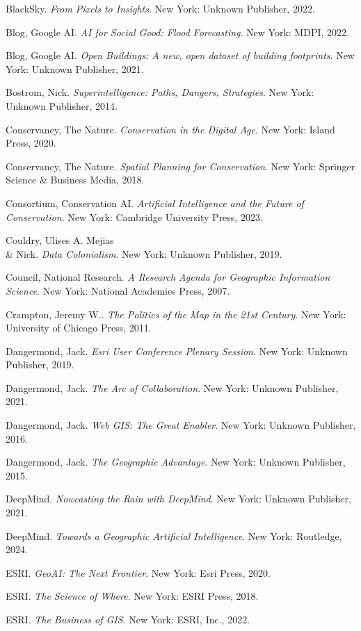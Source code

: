 \begin{hangparas}{0.15in}{1}
BlackSky. \t\textit{From Pixels to Insights}. New York: Unknown Publisher, 2022.

Blog, Google AI. \t\textit{AI for Social Good: Flood Forecasting}. New York: MDPI, 2022.

Blog, Google AI. \t\textit{Open Buildings: A new, open dataset of building footprints}. New York: Unknown Publisher, 2021.

Bostrom, Nick. \t\textit{Superintelligence: Paths, Dangers, Strategies}. New York: Unknown Publisher, 2014.

Conservancy, The Nature. \t\textit{Conservation in the Digital Age}. New York: Island Press, 2020.

Conservancy, The Nature. \t\textit{Spatial Planning for Conservation}. New York: Springer Science & Business Media, 2018.

Consortium, Conservation AI. \t\textit{Artificial Intelligence and the Future of Conservation}. New York: Cambridge University Press, 2023.

Couldry, Ulises A. Mejias \\& Nick. \t\textit{Data Colonialism}. New York: Unknown Publisher, 2019.

Council, National Research. \t\textit{A Research Agenda for Geographic Information Science}. New York: National Academies Press, 2007.

Crampton, Jeremy W.. \t\textit{The Politics of the Map in the 21st Century}. New York: University of Chicago Press, 2011.

Dangermond, Jack. \t\textit{Esri User Conference Plenary Session}. New York: Unknown Publisher, 2019.

Dangermond, Jack. \t\textit{The Arc of Collaboration}. New York: Unknown Publisher, 2021.

Dangermond, Jack. \t\textit{Web GIS: The Great Enabler}. New York: Unknown Publisher, 2016.

Dangermond, Jack. \t\textit{The Geographic Advantage}. New York: Unknown Publisher, 2015.

DeepMind. \t\textit{Nowcasting the Rain with DeepMind}. New York: Unknown Publisher, 2021.

DeepMind. \t\textit{Towards a Geographic Artificial Intelligence}. New York: Routledge, 2024.

ESRI. \t\textit{GeoAI: The Next Frontier}. New York: Esri Press, 2020.

ESRI. \t\textit{The Science of Where}. New York: ESRI Press, 2018.

ESRI. \t\textit{The Business of GIS}. New York: ESRI, Inc., 2022.


\end{hangparas}
